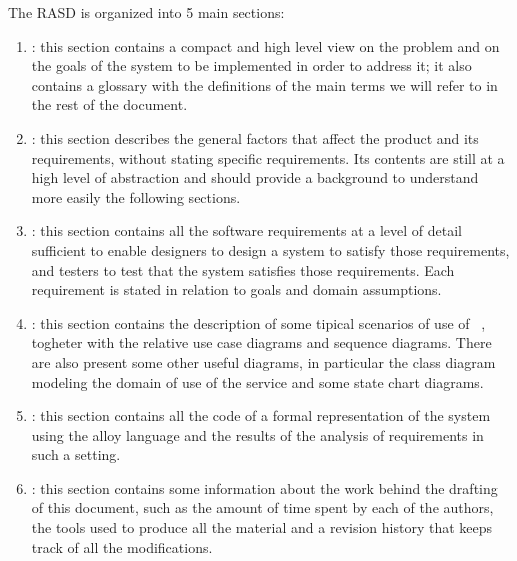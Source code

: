 The RASD is organized into 5 main sections:

\begin{enumerate}
\item {\textbf{}}: this section contains a compact and high level view on the problem and on the goals of the system to be implemented in order to address it; it also contains a glossary with the definitions of the main terms we will refer to in the rest of the document.
\item {\textbf{}}: this section  describes the general factors that affect the product and its requirements, without stating specific requirements. Its contents are still at a high level of abstraction and should provide a background to understand more easily the following sections.
\item {\textbf{}}: this section contains all the software requirements at a level of detail sufficient to enable designers to design a system to satisfy those requirements, and testers to test that the system satisfies those requirements. Each requirement is stated in relation to goals and domain assumptions.
\item {\textbf{}}: this section contains the description of some tipical scenarios of use of \projectname~, togheter with the relative use case diagrams and sequence diagrams. There are also present some other useful diagrams, in particular the class diagram modeling the domain of use of the service and some state chart diagrams.
\item {\textbf{}}: this section contains all the code of a formal representation of the system using the alloy language and the results of the analysis of requirements in such a setting.
\item {\textbf{}}: this section contains some information about the work behind the drafting of this document, such as the amount of time spent by each of the authors, the tools used to produce all the material and a revision history that keeps track of all the modifications.
\end{enumerate}